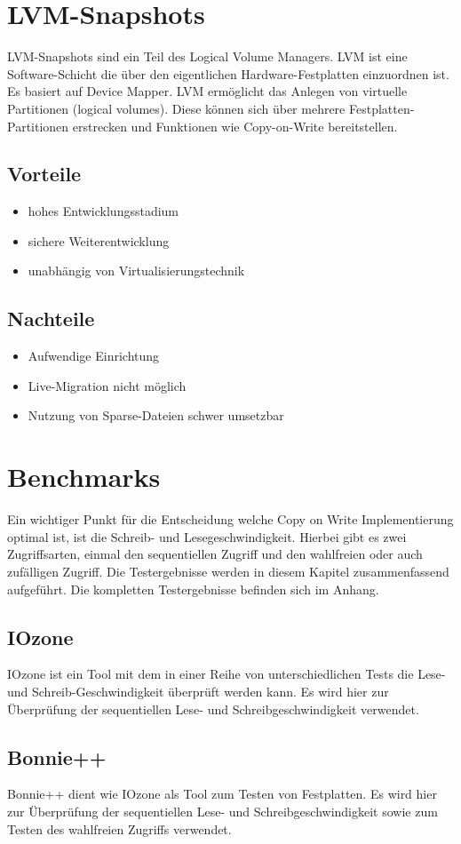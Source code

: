 \section{LVM-Snapshots}
LVM-Snapshots sind ein Teil des Logical Volume Managers. LVM ist eine Software-Schicht die über den eigentlichen Hardware-Festplatten einzuordnen ist. Es basiert auf Device Mapper. LVM ermöglicht das Anlegen von virtuelle Partitionen (logical volumes). Diese können sich über mehrere Festplatten-Partitionen erstrecken und Funktionen wie Copy-on-Write bereitstellen. \cite{lvmhowto} \cite{lvmselflinux} \cite{lvmsource}

\subsection{Vorteile}
\begin{itemize}
 \item hohes Entwicklungsstadium
 \item sichere Weiterentwicklung
 \item unabhängig von Virtualisierungstechnik
\end{itemize}

\subsection{Nachteile}
\begin{itemize}
 \item Aufwendige Einrichtung
 \item Live-Migration nicht möglich
 \item Nutzung von Sparse-Dateien schwer umsetzbar
\end{itemize}

\section{Benchmarks}
Ein wichtiger Punkt für die Entscheidung welche Copy on Write Implementierung optimal ist, ist die Schreib- und Lesegeschwindigkeit. Hierbei gibt es zwei Zugriffsarten, einmal den sequentiellen Zugriff und den wahlfreien oder auch zufälligen Zugriff. Die Testergebnisse werden in diesem Kapitel zusammenfassend aufgeführt. Die kompletten Testergebnisse befinden sich im Anhang.

\subsection{IOzone}
IOzone ist ein Tool mit dem in einer Reihe von unterschiedlichen Tests die Lese- und Schreib-Geschwindigkeit überprüft werden kann. Es wird hier zur Überprüfung der sequentiellen Lese- und Schreibgeschwindigkeit verwendet.
\subsection{Bonnie++}
Bonnie++ dient wie IOzone als Tool zum Testen von Festplatten. Es wird hier zur Überprüfung der sequentiellen Lese- und Schreibgeschwindigkeit sowie zum Testen des wahlfreien Zugriffs verwendet.